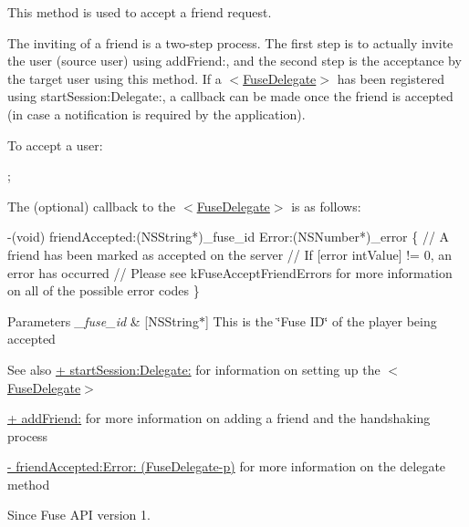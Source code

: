 This method is used to accept a friend request. 

The inviting of a friend is a two-\/step process. The first step is to actually invite the user (source user) using add\+Friend\+:, and the second step is the acceptance by the target user using this method. If a $<$\hyperlink{protocol_fuse_delegate-p}{Fuse\+Delegate}$>$ has been registered using start\+Session\+:\+Delegate\+:, a callback can be made once the friend is accepted (in case a notification is required by the application).

To accept a user\+:


\begin{DoxyCode}
;
\end{DoxyCode}


The (optional) callback to the $<$\hyperlink{protocol_fuse_delegate-p}{Fuse\+Delegate}$>$ is as follows\+:


\begin{DoxyCode}
-(void) friendAccepted:(NSString*)\_fuse\_id Error:(NSNumber*)\_error
\{
   \textcolor{comment}{// A friend has been marked as accepted on the server}
   \textcolor{comment}{// If [error intValue] != 0, an error has occurred}
   \textcolor{comment}{// Please see kFuseAcceptFriendErrors for more information on all of the possible error codes}
\}
\end{DoxyCode}



\begin{DoxyParams}{Parameters}
{\em \+\_\+fuse\+\_\+id} & \mbox{[}N\+S\+String$\ast$\mbox{]} This is the \char`\"{}\+Fuse I\+D\char`\"{} of the player being accepted \\
\hline
\end{DoxyParams}
\begin{DoxySeeAlso}{See also}
\hyperlink{interface_fuse_a_p_i_aab1649c81002a336ca872da6fef36b8d}{+ start\+Session\+:\+Delegate\+:} for information on setting up the $<$\hyperlink{protocol_fuse_delegate-p}{Fuse\+Delegate}$>$ 

\hyperlink{interface_fuse_a_p_i_a92b5888d1e5dafe2ab2a76fda44be4d8}{+ add\+Friend\+:} for more information on adding a friend and the handshaking process 

\hyperlink{protocol_fuse_delegate-p_acf52e0c4576a87e4eb37913206cd9ae3}{-\/ friend\+Accepted\+:\+Error\+: (\+Fuse\+Delegate-\/p)} for more information on the delegate method 
\end{DoxySeeAlso}
\begin{DoxySince}{Since}
Fuse A\+P\+I version 1. 
\end{DoxySince}
\hypertarget{interface_fuse_a_p_i_a92b5888d1e5dafe2ab2a76fda44be4d8}{}
